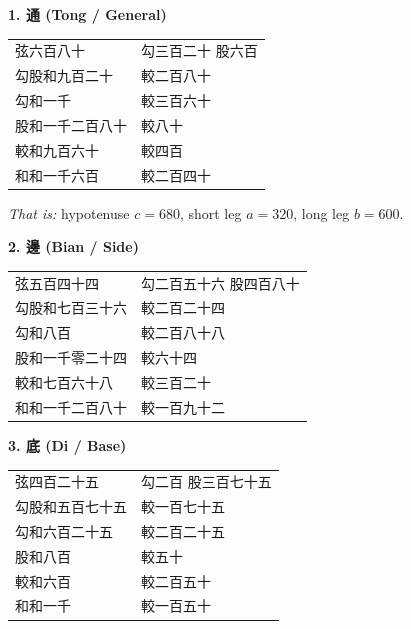 \documentclass[11pt,a4paper]{article}
\begin{document}
\vspace{0.3cm}

\textbf{1. 通 (Tong / General)}

\begin{center}
\begin{tabular}{ll}
弦六百八十 & 勾三百二十 \quad 股六百 \\
勾股和九百二十 & 較二百八十 \\
勾和一千 & 較三百六十 \\
股和一千二百八十 & 較八十 \\
較和九百六十 & 較四百 \\
和和一千六百 & 較二百四十 \\
\end{tabular}
\end{center}

\textit{That is:} hypotenuse $c = 680$, short leg $a = 320$, long leg $b = 600$.

\vspace{0.3cm}

\textbf{2. 邊 (Bian / Side)}

\begin{center}
\begin{tabular}{ll}
弦五百四十四 & 勾二百五十六 \quad 股四百八十 \\
勾股和七百三十六 & 較二百二十四 \\
勾和八百 & 較二百八十八 \\
股和一千零二十四 & 較六十四 \\
較和七百六十八 & 較三百二十 \\
和和一千二百八十 & 較一百九十二 \\
\end{tabular}
\end{center}

\vspace{0.3cm}

\textbf{3. 底 (Di / Base)}

\begin{center}
\begin{tabular}{ll}
弦四百二十五 & 勾二百 \quad 股三百七十五 \\
勾股和五百七十五 & 較一百七十五 \\
勾和六百二十五 & 較二百二十五 \\
股和八百 & 較五十 \\
較和六百 & 較二百五十 \\
和和一千 & 較一百五十 \\
\end{tabular}
\end{center}
\end{document}
